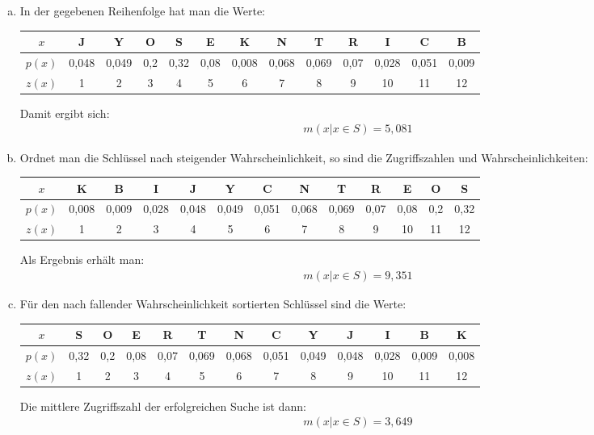 \documentclass[11pt]{article}
\begin{document}
\begin{enumerate}[a)]
  \item 
    In der gegebenen Reihenfolge hat man die Werte:
    \begin{table}[h!]
      \centering
      \begin{tabular}{|c|c|c|c|c|c|c|c|c|c|c|c|c|}
        \hline 
        $x$ & J & Y & O & S & E & K & N & T & R & I & C & B \\ 
        \hline 
        $p(x)$ & 0,048 & 0,049 & 0,2 & 0,32 & 0,08 & 0,008 & 0,068 & 0,069 &
        0,07 & 0,028 & 0,051 & 0,009 \\ 
        \hline 
        $z(x)$ & 1 & 2 & 3 & 4 & 5 & 6 & 7 & 8 & 9 & 10 & 11 & 12 \\ 
        \hline 
      \end{tabular} 
    \end{table}

    Damit ergibt sich:
    \begin{align*}
      m(x \vert x \in S) = 5,081
    \end{align*}
  \item 
    Ordnet man die Schlüssel nach steigender Wahrscheinlichkeit, so sind die
    Zugriffszahlen und Wahrscheinlichkeiten:
    \begin{table}[h!]
      \centering
      \begin{tabular}{|c|c|c|c|c|c|c|c|c|c|c|c|c|}
        \hline 
        $x$ & K & B & I & J & Y & C & N & T & R & E & O & S \\ 
        \hline 
        $p(x)$ & 0,008 & 0,009 & 0,028 & 0,048 & 0,049 & 0,051 & 0,068 & 0,069 &
        0,07 & 0,08 & 0,2 & 0,32 \\ 
        \hline 
        $z(x)$ & 1 & 2 & 3 & 4 & 5 & 6 & 7 & 8 & 9 & 10 & 11 & 12 \\ 
        \hline 
      \end{tabular} 
    \end{table}

    Als Ergebnis erhält man:
    \begin{align*}
      m(x \vert x \in S) = 9,351
    \end{align*}
    \newpage
  \item 
    Für den nach fallender Wahrscheinlichkeit sortierten Schlüssel sind die
    Werte:
    \begin{table}[h!]
      \centering
      \begin{tabular}{|c|c|c|c|c|c|c|c|c|c|c|c|c|}
        \hline 
        $x$ & S & O & E & R & T & N & C & Y & J & I & B & K \\ 
        \hline 
        $p(x)$ & 0,32 & 0,2 & 0,08 & 0,07 & 0,069 & 0,068 & 0,051 & 0,049 &
        0,048 & 0,028 & 0,009 & 0,008 \\ 
        \hline 
        $z(x)$ & 1 & 2 & 3 & 4 & 5 & 6 & 7 & 8 & 9 & 10 & 11 & 12 \\ 
        \hline 
      \end{tabular} 
    \end{table}

    Die mittlere Zugriffszahl der erfolgreichen Suche ist dann:
    \begin{align*}
      m(x \vert x \in S) = 3,649
    \end{align*}
\end{enumerate}
\end{document}
